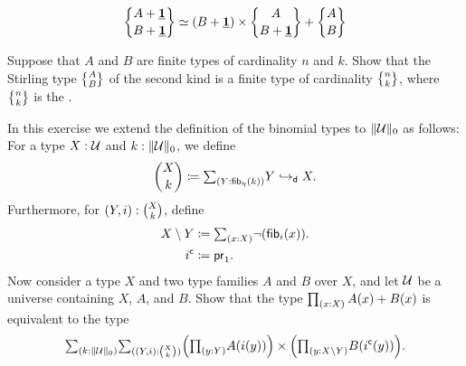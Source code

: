 \begin{exercises}
\begin{subexenum}
  \begin{equation*}
    \stirling{A+\unit}{B+\unit}\simeq (B+\unit)\times\stirling{A}{B+\unit}+\stirling{A}{B}
  \end{equation*}
  \item Suppose that $A$ and $B$ are finite types of cardinality $n$ and $k$. Show that the Stirling type $\stirling{A}{B}$ of the second kind is a finite type of cardinality $\stirling{n}{k}$, where $\stirling{n}{k}$ is the .
  \end{subexenum}
  \exitem \label{ex:distributive-pi-coprod}In this exercise we extend the definition of the binomial types to $\Vert \mathcal{U}\Vert_{0}$ as follows: For a type $X:\mathcal{U}$ and $k:\Vert \mathcal{U}\Vert_{0}$, we define
  \begin{equation*}
    \binomtype{X}{k}\defeq \sm{Y:\fib{\eta}{k}}Y\demb X.
  \end{equation*}
  Furthermore, for $(Y,i):\binom{X}{k}$, define
  \begin{align*}
    X\setminus Y & \defeq \sm{x:X}\neg(\fib{i}{x}). \\
    \complement{i} & \defeq \proj 1.
  \end{align*}
  Now consider a type $X$ and two type families $A$ and $B$ over $X$, and let $\mathcal{U}$ be a universe containing $X$, $A$, and $B$. Show that the type $\prd{x:X}A(x)+B(x)$ is equivalent to the type
  \begin{equation*}
    \sm{k:\trunc{0}{\UU}}\sm{(Y,i):\dbinomtype{X}{k}}\Big(\prd{y:Y}A(i(y))\Big)\times\Big(\prd{y:X\setminus Y}B(\complement{i}(y))\Big).
  \end{equation*}
\end{exercises}

